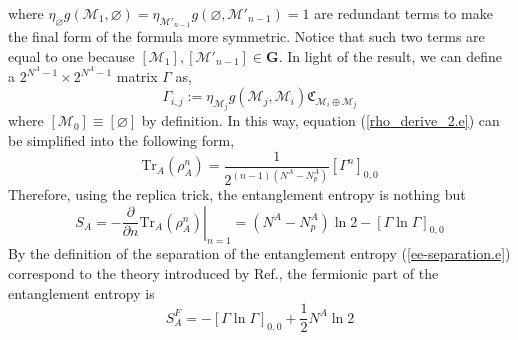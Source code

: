 \documentclass[12font]{article}
\theoremstyle{definition}
\numberwithin{equation}{section}
\newcommand{\lr}[1]{\left(  #1  \right)}
\newcommand{\lrm}[1]{\left[  #1  \right]}
\newcommand{\pdif}[1]{\frac{\partial}{\partial#1}}
\newcommand{\mrm}[1]{\mathrm{#1}}
\newcommand{\bo}[1]{\mathbf{#1}}
\newcommand{\Tr}{\mrm{Tr}}
\newcommand{\Good}{\bo{G}}
\begin{document}
where $\eta_{\varnothing}g(\mathcal{M}_1,\varnothing) = \eta_{\mathcal{M}'_{n-1}}g(\varnothing,\mathcal{M}'_{n-1}) = 1$ are redundant terms to make the final form of the formula more symmetric. Notice that such two terms are equal to one because $[\mathcal{M}_1],[\mathcal{M}'_{n-1}]\in\Good$. In light of the result, we can define a $2^{N^A-1}\times 2^{N^A-1}$ matrix $\Gamma$ as,
\begin{equation}\label{correct-Gamma-def.e}
\Gamma_{i,j} := \eta_{\mathcal{M}_j}g(\mathcal{M}_j,\mathcal{M}_i) \mathfrak{C}_{\mathcal{M}_i\oplus\mathcal{M}_j} 
\end{equation}
where $[\mathcal{M}_0]\equiv[\varnothing]$ by definition. In this way, equation (\ref{rho_derive_2.e}) can be simplified into the following form,
\begin{equation}\label{rho_derive_3.e}
  \Tr_A\lr{\rho_A^n} = \frac{1}{2^{(n-1)(N^A - N_p^A)}}\lrm{\Gamma^n}_{0,0}
\end{equation}
Therefore, using the replica trick, the entanglement entropy is nothing but
\begin{equation}\label{ee-Gamma.e}
  S_A = -\left.\pdif{n}\Tr_A\lr{\rho_A^n}\right|_{n=1} = (N^A - N^A_p)\ln 2 - [\Gamma\ln\Gamma]_{0,0}
\end{equation}
By the definition of the separation of the entanglement entropy (\ref{ee-separation.e}) correspond to the theory introduced by Ref.\cite{Qi}, the fermionic part of the entanglement entropy is
\begin{equation}\label{ee-fermion.e}
  S_A^F = -[\Gamma\ln\Gamma]_{0,0} + \frac{1}{2}N^A\ln 2
\end{equation}
\end{document}
